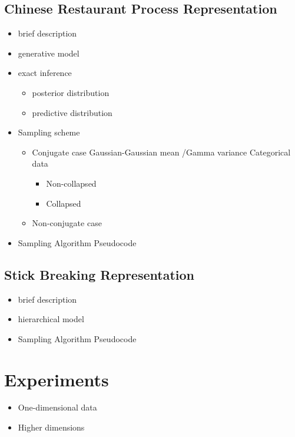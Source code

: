 \documentclass{article}
\begin{document}
\subsection{Chinese Restaurant Process Representation}
\begin{itemize}
	\item brief description
	\item generative model
	\item exact inference
		\begin{itemize}
			\item posterior distribution
			\item predictive distribution
		\end{itemize}
	\item Sampling scheme
		\begin{itemize}
			\item Conjugate case
			Gaussian-Gaussian mean /Gamma variance
			Categorical data			
			\begin{itemize}
				\item Non-collapsed
				\item Collapsed
			\end{itemize}
			\item Non-conjugate case
		\end{itemize}
	\item Sampling Algorithm Pseudocode \cite{neal2000markov}
\end{itemize}


\subsection{Stick Breaking Representation}

\begin{itemize}
	\item brief description
	\item hierarchical model
	\item Sampling Algorithm Pseudocode
\end{itemize}

\section{Experiments}

\begin{itemize}
	\item One-dimensional data
	\item Higher dimensions
\end{itemize}
\end{document}
